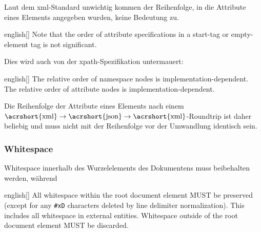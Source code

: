 Laut dem \acrshort{xml}-Standard unwichtig kommen der Reihenfolge, in die Attribute eines Elements angegeben wurden, keine Bedeutung zu.

\begin{foreigndisplayquote}{english}[{\cite[Abschnitt~3.1]{maler2008xml}}]
Note that the order of attribute specifications in a start-tag or empty-element tag is not significant.
\end{foreigndisplayquote}

Dies wird auch von der \acrshort{xpath}-Spezifikation untermauert:

\begin{foreigndisplayquote}{english}[{\cite[Abschnitt~5]{clark1999xpath1}}]
The relative order of namespace nodes is implementation-dependent. The relative order of attribute nodes is implementation-dependent.
\end{foreigndisplayquote}

Die Reihenfolge der Attribute eines Elements nach einem $\text{\acrshort{xml}}\rightarrow{}\text{\acrshort{json}}\rightarrow{}\text{\acrshort{xml}}$-Roundtrip ist daher beliebig und muss nicht mit der Reihenfolge vor der Umwandlung identisch sein.

\subsubsection{Whitespace}

Whitespace innerhalb des Wurzelelements des Dokumentens muss beibehalten werden, während 

\begin{foreigndisplayquote}{english}[{\cite[Abschnitt~2.1]{boyer2001c14n}}]
    All whitespace within the root document element MUST be preserved (except for any \texttt{\#xD} characters deleted by line delimiter normalization). This includes all whitespace in external entities. Whitespace outside of the root document element MUST be discarded.
\end{foreigndisplayquote}


